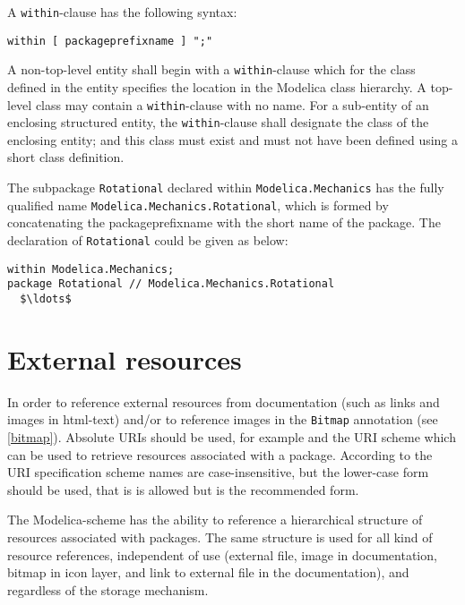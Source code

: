 A \lstinline!within!-clause has the following syntax:
\begin{lstlisting}[language=grammar]
  within [ packageprefixname ] ";"
\end{lstlisting}%
A non-top-level entity shall begin with a \lstinline!within!-clause which for the class defined in the entity specifies the location in the Modelica class hierarchy.
A top-level class may contain a \lstinline!within!-clause with no name.
For a sub-entity of an enclosing structured entity, the \lstinline!within!-clause shall designate the class of the enclosing entity; and this class must exist and must not have been defined using a short class definition.

\begin{example}
The subpackage \lstinline!Rotational! declared within
\lstinline!Modelica.Mechanics! has the fully qualified name
\lstinline!Modelica.Mechanics.Rotational!, which is formed by concatenating
the packageprefixname with the short name of the package. The
declaration of \lstinline!Rotational! could be given as below:
\begin{lstlisting}[language=modelica]
within Modelica.Mechanics;
package Rotational // Modelica.Mechanics.Rotational
  $\ldots$
\end{lstlisting}
\end{example}

\section{External resources}\label{external-resources}

In order to reference external resources from documentation (such as links and images in html-text) and/or to reference images in the \lstinline!Bitmap! annotation (see \cref{bitmap}).
Absolute URIs should be used, for example  and the URI scheme  which can be used to retrieve resources associated with a package.
According to the URI specification scheme names are case-insensitive, but the lower-case form should be used, that is  is allowed but  is the recommended form.

The Modelica-scheme has the ability to reference a hierarchical structure of resources associated with packages.
The same structure is used for all kind of resource references, independent of use (external file, image in documentation, bitmap in icon layer, and link to external file in the documentation), and regardless of the storage mechanism.

